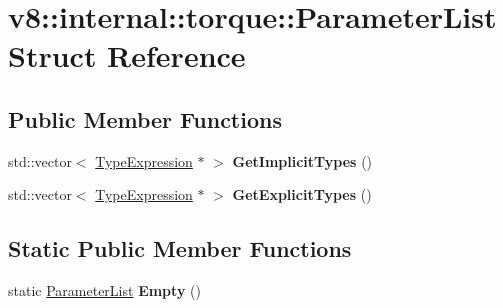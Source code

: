 \hypertarget{structv8_1_1internal_1_1torque_1_1ParameterList}{}\section{v8\+:\+:internal\+:\+:torque\+:\+:Parameter\+List Struct Reference}
\label{structv8_1_1internal_1_1torque_1_1ParameterList}
\subsection*{Public Member Functions}
\begin{DoxyCompactItemize}
\item 
\mbox{\label{structv8_1_1internal_1_1torque_1_1ParameterList_a4cc90c00b0fa3cb754fe2f86450f5f9a}} 
std\+::vector$<$ \mbox{\hyperlink{structv8_1_1internal_1_1torque_1_1TypeExpression}{Type\+Expression}} $\ast$ $>$ {\bfseries Get\+Implicit\+Types} ()
\item 
\mbox{\label{structv8_1_1internal_1_1torque_1_1ParameterList_a90e3385cc7aa109bed794a3751c8eff0}} 
std\+::vector$<$ \mbox{\hyperlink{structv8_1_1internal_1_1torque_1_1TypeExpression}{Type\+Expression}} $\ast$ $>$ {\bfseries Get\+Explicit\+Types} ()
\end{DoxyCompactItemize}
\subsection*{Static Public Member Functions}
\begin{DoxyCompactItemize}
\item 
\mbox{\label{structv8_1_1internal_1_1torque_1_1ParameterList_a89b01ba19e1e813177d1a239080f70d3}} 
static \mbox{\hyperlink{structv8_1_1internal_1_1torque_1_1ParameterList}{Parameter\+List}} {\bfseries Empty} ()
\end{DoxyCompactItemize}

